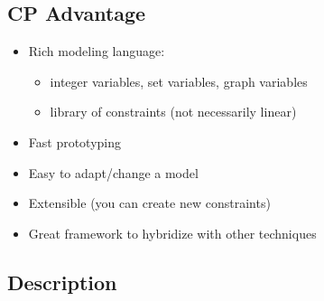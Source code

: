 
\subsection{CP Advantage}
\begin{itemize}
    \item Rich modeling language:
        \begin{itemize}
            \item  integer variables, set variables, graph variables
            \item  library of constraints (not necessarily linear)
        \end{itemize}
    \item  Fast prototyping
    \item  Easy to adapt/change a model
    \item  Extensible (you can create new constraints)
    \item  Great framework to hybridize with other techniques
\end{itemize}

\subsection{Description}


